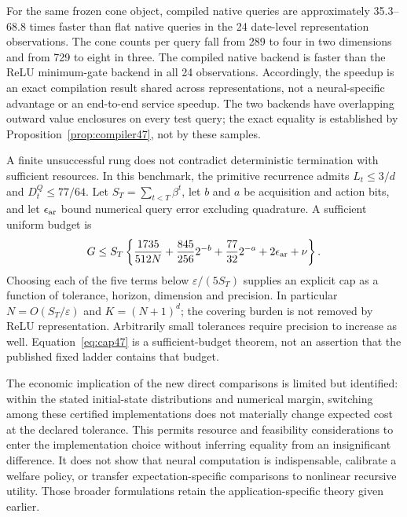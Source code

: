 For the same frozen cone object, compiled native queries are approximately 35.3--68.8 times faster than flat native queries in the 24 date-level representation observations. The cone counts per query fall from 289 to four in two dimensions and from 729 to eight in three. The compiled native backend is faster than the ReLU minimum-gate backend in all 24 observations. Accordingly, the speedup is an exact compilation result shared across representations, not a neural-specific advantage or an end-to-end service speedup. The two backends have overlapping outward value enclosures on every test query; the exact equality is established by Proposition~\ref{prop:compiler47}, not by these samples.


A finite unsuccessful rung does not contradict deterministic termination with sufficient resources. In this benchmark, the primitive recurrence admits $L_t\le3/d$ and $D_t^Q\le77/64$. Let $S_T=\sum_{t<T}\beta^t$, let $b$ and $a$ be acquisition and action bits, and let $\epsilon_{\rm ar}$ bound numerical query error excluding quadrature. A sufficient uniform budget is
\begin{equation}\label{eq:cap47}
 G\le S_T\left\{\frac{1735}{512N}
     +\frac{845}{256}2^{-b}+\frac{77}{32}2^{-a}
     +2\epsilon_{\rm ar}+\nu\right\}.
\end{equation}
Choosing each of the five terms below $\varepsilon/(5S_T)$ supplies an explicit cap as a function of tolerance, horizon, dimension and precision. In particular $N=O(S_T/\varepsilon)$ and $K=(N+1)^d$; the covering burden is not removed by ReLU representation. Arbitrarily small tolerances require precision to increase as well. Equation~\eqref{eq:cap47} is a sufficient-budget theorem, not an assertion that the published fixed ladder contains that budget.

The economic implication of the new direct comparisons is limited but identified: within the stated initial-state distributions and numerical margin, switching among these certified implementations does not materially change expected cost at the declared tolerance. This permits resource and feasibility considerations to enter the implementation choice without inferring equality from an insignificant difference. It does not show that neural computation is indispensable, calibrate a welfare policy, or transfer expectation-specific comparisons to nonlinear recursive utility. Those broader formulations retain the application-specific theory given earlier.
